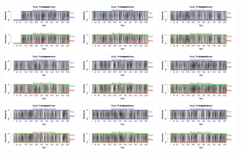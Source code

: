 \begin{figure}[th]
\centering
\includegraphics[width=0.30\textwidth]{Figures/BiasResp_Exp2_P1} \includegraphics[width=0.30\textwidth]{Figures/BiasResp_Exp2_P2} \includegraphics[width=0.30\textwidth]{Figures/BiasResp_Exp2_P3}
\includegraphics[width=0.30\textwidth]{Figures/BiasResp_Exp2_P4} \includegraphics[width=0.30\textwidth]{Figures/BiasResp_Exp2_P5} \includegraphics[width=0.30\textwidth]{Figures/BiasResp_Exp2_P6}
\includegraphics[width=0.30\textwidth]{Figures/BiasResp_Exp2_P7} \includegraphics[width=0.30\textwidth]{Figures/BiasResp_Exp2_P8} \includegraphics[width=0.30\textwidth]{Figures/BiasResp_Exp2_P9}

\end{figure}
